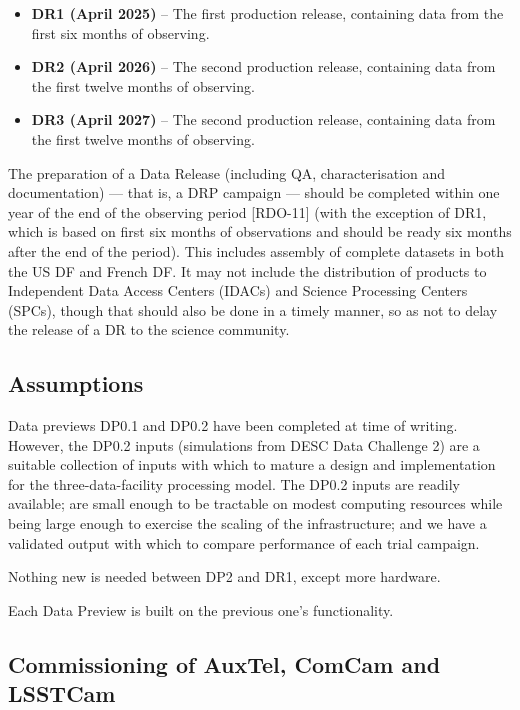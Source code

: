 \begin{itemize}
\item {\bf DR1 (April 2025)} -- The first production release, containing data from the first six months of observing.
  
\item {\bf DR2 (April 2026)} -- The second production release, containing data from the first twelve months of observing.
  
\item {\bf DR3 (April 2027)} -- The second production release, containing data from the first twelve months of observing.
  
\end{itemize}

The preparation of a Data Release (including QA, characterisation and documentation) --- that is, a DRP campaign --- should be completed within one year of the end of the observing period [RDO-11] (with the exception of DR1, which is based on first six months of observations and should be ready six months after the end of the period). This includes assembly of complete datasets in both the US DF and French DF. It may not include the distribution of products to Independent Data Access Centers (IDACs) and Science Processing Centers (SPCs), though that should also be done in a timely manner, so as not to delay the release of a DR to the science community.


\subsection{Assumptions}

Data previews DP0.1 and DP0.2 have been completed at time of writing. However, the DP0.2 inputs (simulations from DESC Data Challenge 2) are a suitable collection of inputs with which to mature a design and implementation for the three-data-facility processing model. The DP0.2 inputs are readily available; are small enough to be tractable on modest computing resources while being large enough to exercise the scaling of the infrastructure; and we have a validated output with which to compare performance of each trial campaign.

Nothing new is needed between \gls{DP2} and \gls{DR1}, except more
hardware.

Each Data Preview is built on the previous one's functionality.

\subsection{Commissioning of AuxTel, ComCam and LSSTCam}

